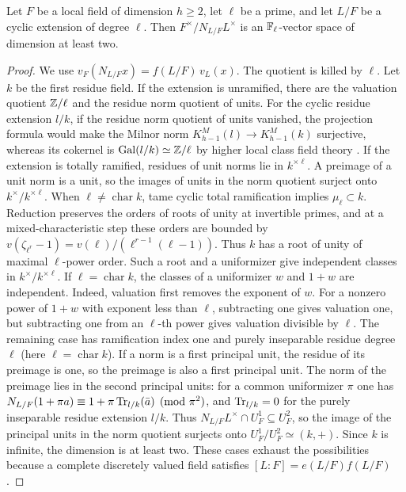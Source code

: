 \begin{lemma}\label{lem:second-three-norm-quotient}
Let $F$ be a local field of dimension $h\ge2$, let $\ell$ be a prime, and let $L/F$ be a cyclic extension of degree $\ell$.
Then $F^\times/N_{L/F}L^\times$ is an $\mathbb F_\ell$-vector space of dimension at least two.
\end{lemma}
\begin{proof}
We use $v_F(N_{L/F}x)=f(L/F)\,v_L(x)$.
The quotient is killed by $\ell$.
Let $k$ be the first residue field.
If the extension is unramified, there are the valuation quotient $\mathbb Z/\ell$ and the residue norm quotient of units.
For the cyclic residue extension $l/k$, if the residue norm quotient of units vanished, the projection formula would make the Milnor norm $K_{h-1}^M(l)\to K_{h-1}^M(k)$ surjective, whereas its cokernel is $\operatorname{Gal}(l/k)\simeq\mathbb Z/\ell$ by higher local class field theory \cite[\S0, p.\ 168]{KatoExistence}.
If the extension is totally ramified, residues of unit norms lie in $k^{\times\ell}$.
A preimage of a unit norm is a unit, so the images of units in the norm quotient surject onto $k^\times/k^{\times\ell}$.
When $\ell\ne\operatorname{char}k$, tame cyclic total ramification implies $\mu_\ell\subset k$.
Reduction preserves the orders of roots of unity at invertible primes, and at a mixed-characteristic step these orders are bounded by $v(\zeta_{\ell^r}-1)=v(\ell)/(\ell^{r-1}(\ell-1))$.
Thus $k$ has a root of unity of maximal $\ell$-power order.
Such a root and a uniformizer give independent classes in $k^\times/k^{\times\ell}$.
If $\ell=\operatorname{char}k$, the classes of a uniformizer $w$ and $1+w$ are independent.
Indeed, valuation first removes the exponent of $w$.
For a nonzero power of $1+w$ with exponent less than $\ell$, subtracting one gives valuation one, but subtracting one from an $\ell$-th power gives valuation divisible by $\ell$.
The remaining case has ramification index one and purely inseparable residue degree $\ell$ (here $\ell=\operatorname{char}k$).
If a norm is a first principal unit, the residue of its preimage is one, so the preimage is also a first principal unit.
The norm of the preimage lies in the second principal units: for a common uniformizer $\pi$ one has $N_{L/F}(1+\pi a)\equiv1+\pi\operatorname{Tr}_{l/k}(\bar a)\pmod{\pi^2}$, and $\operatorname{Tr}_{l/k}=0$ for the purely inseparable residue extension $l/k$.
Thus $N_{L/F}L^\times\cap U_F^1\subseteq U_F^2$, so the image of the principal units in the norm quotient surjects onto $U_F^1/U_F^2\simeq(k,+)$.
Since $k$ is infinite, the dimension is at least two.
These cases exhaust the possibilities because a complete discretely valued field satisfies $[L:F]=e(L/F)f(L/F)$.
\end{proof}


